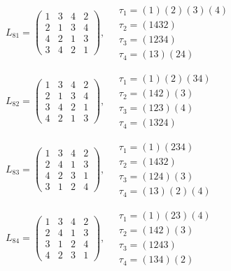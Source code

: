 $L_{81} = \begin{pmatrix} 1 & 3 & 4 & 2 \\ 2 & 1 & 3 & 4 \\ 4 & 2 & 1 & 3 \\ 3 & 4 & 2 & 1 \end{pmatrix}, \quad \begin{matrix} \tau_{1} = (1)(2)(3)(4) \\ \tau_{2} = (1 4 3 2) \\ \tau_{3} = (1 2 3 4) \\ \tau_{4} = (1 3)(2 4) \end{matrix}$

$L_{82} = \begin{pmatrix} 1 & 3 & 4 & 2 \\ 2 & 1 & 3 & 4 \\ 3 & 4 & 2 & 1 \\ 4 & 2 & 1 & 3 \end{pmatrix}, \quad \begin{matrix} \tau_{1} = (1)(2)(3 4) \\ \tau_{2} = (1 4 2)(3) \\ \tau_{3} = (1 2 3)(4) \\ \tau_{4} = (1 3 2 4) \end{matrix}$

$L_{83} = \begin{pmatrix} 1 & 3 & 4 & 2 \\ 2 & 4 & 1 & 3 \\ 4 & 2 & 3 & 1 \\ 3 & 1 & 2 & 4 \end{pmatrix}, \quad \begin{matrix} \tau_{1} = (1)(2 3 4) \\ \tau_{2} = (1 4 3 2) \\ \tau_{3} = (1 2 4)(3) \\ \tau_{4} = (1 3)(2)(4) \end{matrix}$

$L_{84} = \begin{pmatrix} 1 & 3 & 4 & 2 \\ 2 & 4 & 1 & 3 \\ 3 & 1 & 2 & 4 \\ 4 & 2 & 3 & 1 \end{pmatrix}, \quad \begin{matrix} \tau_{1} = (1)(2 3)(4) \\ \tau_{2} = (1 4 2)(3) \\ \tau_{3} = (1 2 4 3) \\ \tau_{4} = (1 3 4)(2) \end{matrix}$

